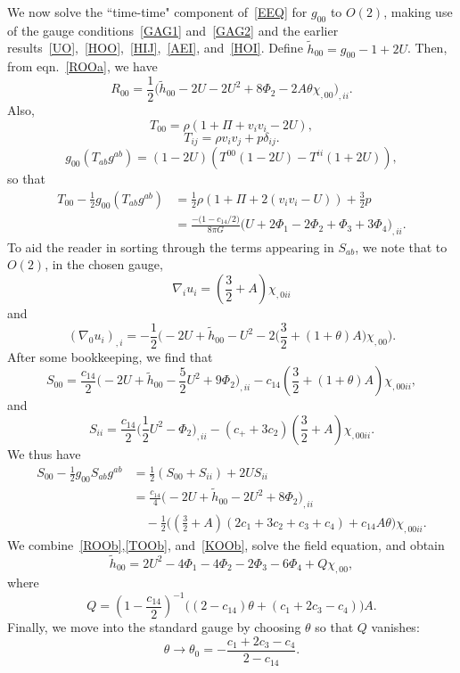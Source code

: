 \documentclass[aps,prd,preprint,amsmath,amssymb]{revtex4}
\def\beq{\begin{equation}}
\def\eeq{\end{equation}}
\def\half{\frac{1}{2}}
\begin{document}
We now solve the ``time-time" component of~\eqref{EEQ} for
$g_{00}$ to $O(2)$, making use of the gauge
conditions~\eqref{GAG1} and~\eqref{GAG2} and the earlier
results~\eqref{UO},~\eqref{HOO},~\eqref{HIJ},~\eqref{AEI},
and~\eqref{HOI}.  Define ${\tilde h}_{00} = g_{00} -1 + 2U$. Then,
from eqn.~\eqref{ROOa}, we have
%
\beq\label{ROOb}
    R_{00} = \half \big({\tilde h}_{00} - 2U
    -2U^2+8\Phi_2-2A\theta\chi_{,00}\big)_{,ii}.
\eeq
%
Also,
%
\beq
    T_{00} =\rho (1+\Pi+v_iv_i - 2U),
\eeq
%
\beq
     T_{ij} = \rho v_i v_j + p \delta_{ij}.
\eeq
%
%
\beq
    g_{00}(T_{ab}g^{ab})=(1-2U)(T^{00}(1-2U)-T^{ii}(1+2U)),
\eeq
%
so that
%
\beq\label{TOOb}\begin{split}
    T_{00}-\half g_{00}(T_{ab}g^{ab})
        &= \half \rho(1+\Pi+2(v_iv_i - U))+\frac{3}{2}p\\
        &=\frac{-\big(1-c_{14}/2\big)}{8 \pi G}
            \big(U+2\Phi_1 - 2\Phi_2+\Phi_3+3\Phi_4\big)_{,ii}.
\end{split}
\eeq
%
To aid the reader in sorting through the terms appearing in
$S_{ab}$, we note that to $O(2)$, in the chosen gauge,
%
\beq
    \nabla_i u_i =(\frac{3}{2}+A) \chi_{,0ii}
\eeq
%
and
%
\beq
    (\nabla_0 u_i)_{,i} = -\half\Big(-2U + {\tilde h}_{00}
        -U^2 -2\big(\frac{3}{2}+(1+\theta)A\big) \chi_{,00}\Big).
\eeq
%
After some bookkeeping, we find that
%
\beq
    S_{00}= \frac{c_{14}}{2}\big(-2U + {\tilde h}_{00}
        -\frac{5}{2}U^2+9\Phi_2\big)_{,ii}
        -c_{14}(\frac{3}{2}+(1+\theta)A)\chi_{,00ii},
\eeq
%
and
%
\beq
    S_{ii} = \frac{c_{14}}{2}\big(\half U^2 - \Phi_2)_{,ii}
    -(c_+ + 3c_2)(\frac{3}{2}+A)\chi_{,00ii}.
\eeq
%
We thus have
%
\beq\label{KOOb}\begin{split}
    S_{00} - \half g_{00}S_{ab}g^{ab} &=
    \half(S_{00} + S_{ii}) + 2US_{ii}\\
        &=\frac{c_{14}}{4}\Big(-2U +
        {\tilde h}_{00} -2 U^2 + 8 \Phi_2\Big)_{,ii}\\
        &\quad
        -\half\Big((\frac{3}{2}+A)(2c_1+3c_2+c_3+c_4)
         + c_{14}A\theta\Big)
        \chi_{,00ii}.
\end{split}
\eeq
%
We combine~\eqref{ROOb},\eqref{TOOb}, and~\eqref{KOOb}, solve the
field equation, and obtain
%
%
%
\beq\label{HOOb}
    {\tilde h}_{00}
    = 2U^2-4\Phi_1 -4\Phi_2 -2\Phi_3-6\Phi_4
        +Q\chi_{,00},
\eeq
%
where
%
\beq
    Q=(1-\frac{c_{14}}{2})^{-1}\big((2-c_{14})\theta+(c_1+2c_3-c_4)\big)A.
\eeq
%
Finally, we move into the standard gauge by choosing $\theta$ so
that $Q$ vanishes:
%
\beq\label{theta}
    \theta \longrightarrow \theta_0=-\frac{c_1+2c_3-c_4}{2-c_{14}}.
\eeq
%
%
%
\end{document}
